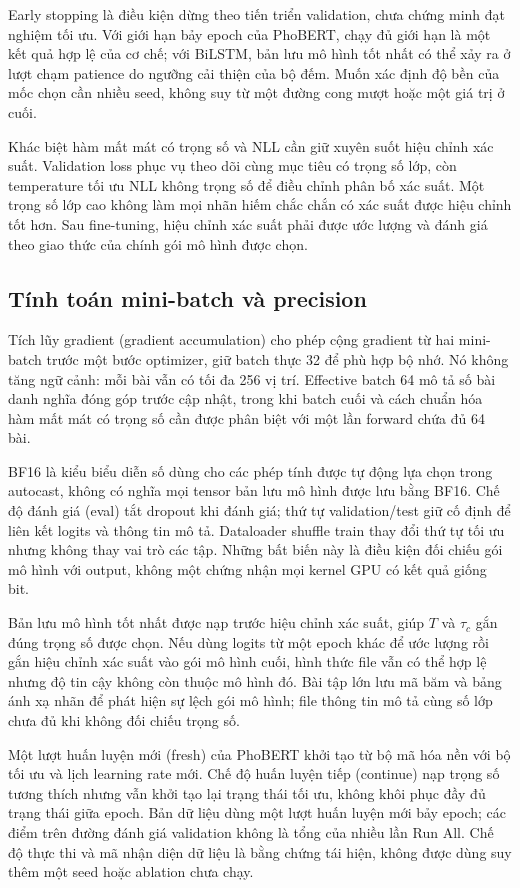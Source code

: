 Early stopping là điều kiện dừng theo tiến triển validation, chưa chứng minh đạt nghiệm tối ưu. Với giới hạn bảy epoch của PhoBERT, chạy đủ giới hạn là một kết quả hợp lệ của cơ chế; với BiLSTM, bản lưu mô hình tốt nhất có thể xảy ra ở lượt chạm patience do ngưỡng cải thiện của bộ đếm. Muốn xác định độ bền của mốc chọn cần nhiều seed, không suy từ một đường cong mượt hoặc một giá trị ở cuối.

Khác biệt hàm mất mát có trọng số và NLL cần giữ xuyên suốt hiệu chỉnh xác suất. Validation loss phục vụ theo dõi cùng mục tiêu có trọng số lớp, còn temperature tối ưu NLL không trọng số để điều chỉnh phân bố xác suất. Một trọng số lớp cao không làm mọi nhãn hiếm chắc chắn có xác suất được hiệu chỉnh tốt hơn. Sau fine-tuning, hiệu chỉnh xác suất phải được ước lượng và đánh giá theo giao thức của chính gói mô hình được chọn.


\subsection{Tính toán mini-batch và precision}
Tích lũy gradient (gradient accumulation) cho phép cộng gradient từ hai mini-batch trước một bước optimizer, giữ batch thực 32 để phù hợp bộ nhớ. Nó không tăng ngữ cảnh: mỗi bài vẫn có tối đa 256 vị trí. Effective batch 64 mô tả số bài danh nghĩa đóng góp trước cập nhật, trong khi batch cuối và cách chuẩn hóa hàm mất mát có trọng số cần được phân biệt với một lần forward chứa đủ 64 bài.

BF16 là kiểu biểu diễn số dùng cho các phép tính được tự động lựa chọn trong autocast, không có nghĩa mọi tensor bản lưu mô hình được lưu bằng BF16. Chế độ đánh giá (eval) tắt dropout khi đánh giá; thứ tự validation/test giữ cố định để liên kết logits và thông tin mô tả. Dataloader shuffle train thay đổi thứ tự tối ưu nhưng không thay vai trò các tập. Những bất biến này là điều kiện đối chiếu gói mô hình với output, không một chứng nhận mọi kernel GPU có kết quả giống bit.

\TrainDiagram
Bản lưu mô hình tốt nhất được nạp trước hiệu chỉnh xác suất, giúp $T$ và $\tau_c$ gắn đúng trọng số được chọn. Nếu dùng logits từ một epoch khác để ước lượng rồi gắn hiệu chỉnh xác suất vào gói mô hình cuối, hình thức file vẫn có thể hợp lệ nhưng độ tin cậy không còn thuộc mô hình đó. Bài tập lớn lưu mã băm và bảng ánh xạ nhãn để phát hiện sự lệch gói mô hình; file thông tin mô tả cùng số lớp chưa đủ khi không đối chiếu trọng số.

Một lượt huấn luyện mới (fresh) của PhoBERT khởi tạo từ bộ mã hóa nền với bộ tối ưu và lịch learning rate mới. Chế độ huấn luyện tiếp (continue) nạp trọng số tương thích nhưng vẫn khởi tạo lại trạng thái tối ưu, không khôi phục đầy đủ trạng thái giữa epoch. Bản dữ liệu dùng một lượt huấn luyện mới bảy epoch; các điểm trên đường đánh giá validation không là tổng của nhiều lần Run All. Chế độ thực thi và mã nhận diện dữ liệu là bằng chứng tái hiện, không được dùng suy thêm một seed hoặc ablation chưa chạy.

